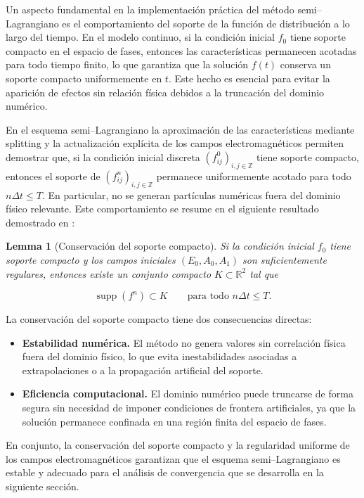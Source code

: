 \documentclass[11pt,a4paper,twoside,pdf]{article}
\numberwithin{equation}{section}
\newtheorem{lemma}[theorem]{Lemma}
\begin{document}
Un aspecto fundamental en la implementación práctica del método semi–Lagrangiano
es el comportamiento del soporte de la función de distribución a lo largo del tiempo.
En el modelo continuo, si la condición inicial $f_0$ tiene soporte compacto en el
espacio de fases, entonces las características permanecen acotadas para todo tiempo
finito, lo que garantiza que la solución $f(t)$ conserva un soporte compacto
uniformemente en $t$. Este hecho es esencial para evitar la aparición de efectos
sin relación física debidos a la truncación del dominio numérico.

En el esquema semi–Lagrangiano la aproximación de
las características mediante splitting y la actualización explícita de los campos
electromagnéticos permiten demostrar que, si la condición inicial discreta
$(f^0_{ij})_{i,j\in\mathbb{Z}}$ tiene soporte compacto, entonces el soporte de
$(f^n_{ij})_{i,j\in\mathbb{Z}}$ permanece uniformemente acotado para todo
$n\Delta t\le T$. En particular, no se generan partículas numéricas fuera del dominio
físico relevante. Este comportamiento se resume en el siguiente resultado demostrado en \cite{bostan2009convergence}:

\begin{lemma}[Conservación del soporte compacto]
Si la condición inicial $f_0$ tiene soporte compacto y los campos iniciales
$(E_0,A_0,A_1)$ son suficientemente regulares, entonces existe un conjunto compacto
$K\subset\mathbb{R}^2$ tal que


\[
\operatorname{supp}(f^n)\subset K \qquad \text{para todo } n\Delta t\le T.
\]


\end{lemma}

La conservación del soporte compacto tiene dos consecuencias directas:

\begin{itemize}
\item \textbf{Estabilidad numérica.}  
El método no genera valores sin correlación física fuera del dominio físico, lo que evita
inestabilidades asociadas a extrapolaciones o a la propagación artificial del
soporte.

\item \textbf{Eficiencia computacional.}  
El dominio numérico puede truncarse de forma segura sin necesidad de imponer
condiciones de frontera artificiales, ya que la solución permanece confinada en
una región finita del espacio de fases.
\end{itemize}

En conjunto, la conservación del soporte compacto y la regularidad uniforme de los
campos electromagnéticos garantizan que el esquema semi–Lagrangiano es estable y
adecuado para el análisis de convergencia que se desarrolla en la siguiente sección.
\end{document}
